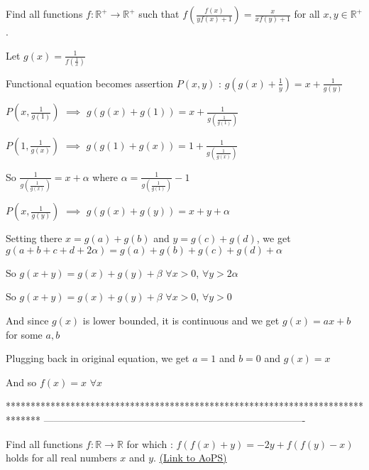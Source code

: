 \begin{solution}
	\begin{tcolorbox}Find all functions $f: \mathbb{R}^{+} \to \mathbb{R}^{+}$ such that $ \displaystyle f\left (\frac{f(x)}{yf(x)+1} \right )=\frac{x}{xf(y)+1} $ for all $x,y\in \mathbb{R}^{+}$.\end{tcolorbox}
Let $g(x)=\frac 1{f(\frac 1x)}$

Functional equation becomes assertion $P(x,y)$ : $g\left(g(x)+\frac 1y\right)=x+\frac 1{g(y)}$

$P(x,\frac 1{g(1)})$ $\implies$  $g\left(g(x)+g(1)\right)=x+\frac 1{g(\frac 1{g(1)})}$

$P(1,\frac 1{g(x)})$ $\implies$  $g\left(g(1)+g(x)\right)=1+\frac 1{g(\frac 1{g(x)})}$

So $\frac 1{g(\frac 1{g(x)})}=x+\alpha$ where $\alpha=\frac 1{g(\frac 1{g(1)})}-1$

$P(x,\frac 1{g(y)})$ $\implies$  $g\left(g(x)+g(y)\right)=x+y+\alpha$

Setting there $x=g(a)+g(b)$ and $y=g(c)+g(d)$, we get $g(a+b+c+d+2\alpha)=g(a)+g(b)+g(c)+g(d)+\alpha$

So $g(x+y)=g(x)+g(y)+\beta$ $\forall x>0$, $\forall y>2\alpha$

So $g(x+y)=g(x)+g(y)+\beta$ $\forall x>0$, $\forall y>0$

And since $g(x)$ is lower bounded, it is continuous and we get $g(x)=ax+b$ for some $a,b$

Plugging back in original equation, we get $a=1$ and $b=0$ and $g(x)=x$

And so $\boxed{f(x)=x}$ $\forall x$
\end{solution}
*******************************************************************************
-------------------------------------------------------------------------------

\begin{problem}
	Find all functions $f: \mathbb{R}\rightarrow \mathbb{R}$ for which :
$f(f(x)+y)=-2y+f(f(y)-x)$
holds for all real numbers $x$ and $y$.
	\flushright \href{https://artofproblemsolving.com/community/c6h567869}{(Link to AoPS)}
\end{problem}




